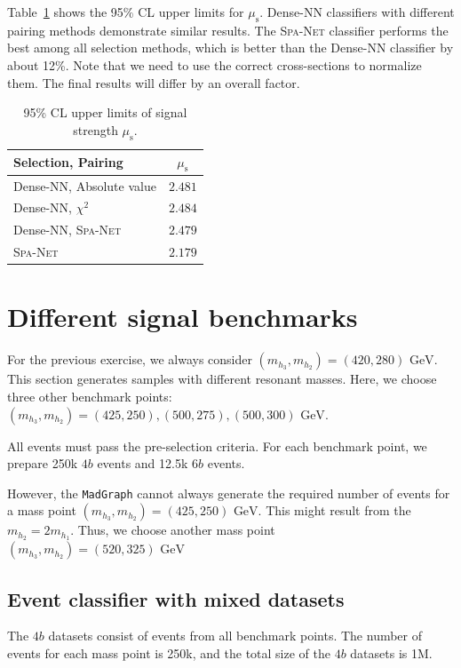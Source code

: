 \documentclass[12pt]{article}
\begin{document}
         Table~\ref{tab:signal_strength_upper_limit_1M_tem} shows the 95\% CL upper limits for $\mu_{\text{s}}$. Dense-NN classifiers with different pairing methods demonstrate similar results. The \textsc{Spa-Net} classifier performs the best among all selection methods, which is better than the Dense-NN classifier by about 12\%. Note that we need to use the correct cross-sections to normalize them. The final results will differ by an overall factor.
        \begin{table}[htpb]
            \centering
            \caption{95\% CL upper limits of signal strength $\mu_{\text{s}}$.}
            \label{tab:signal_strength_upper_limit_1M_tem}
            \begin{tabular}{l|c}
                Selection, Pairing         & $\mu_{\text{s}}$ \\ \hline
                Dense-NN, Absolute value   & $2.481$          \\
                Dense-NN, $\chi^2$         & $2.484$          \\
                Dense-NN, \textsc{Spa-Net} & $2.479$          \\
                \textsc{Spa-Net}           & $2.179$         
            \end{tabular}
        \end{table}
\section{Different signal benchmarks}%
\label{sec:different_signal_benchmarks}
    For the previous exercise, we always consider $(m_{h_3}, m_{h_2}) = (420, 280) \text{ GeV}$. This section generates samples with different resonant masses. Here, we choose three other benchmark points: $(m_{h_3}, m_{h_2}) = (425, 250), (500, 275), (500, 300) \text{ GeV}$.

    All events must pass the pre-selection criteria. For each benchmark point, we prepare 250k $4b$ events and 12.5k $6 b$ events.

    However, the \verb|MadGraph| cannot always generate the required number of events for a mass point $(m_{h_3}, m_{h_2}) = (425, 250) \text{ GeV}$. This might result from the $m_{h_2} = 2m_{h_1}$. Thus, we choose another mass point $(m_{h_3}, m_{h_2}) = (520, 325) \text{ GeV}$

    \subsection{Event classifier with mixed datasets}%
    \label{sub:event_classifier_with_mixed_datasets}
        The $4b$ datasets consist of events from all benchmark points. The number of events for each mass point is 250k, and the total size of the $4b$ datasets is 1M.
\end{document}
